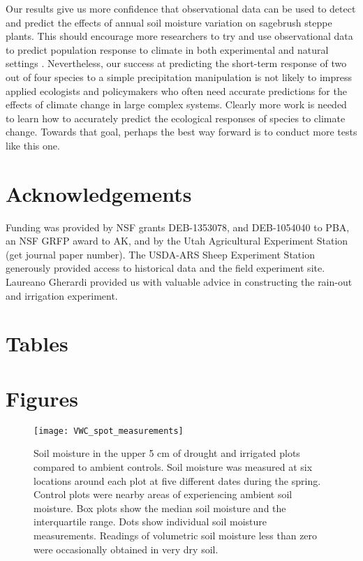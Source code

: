 \documentclass[11pt]{article}
\begin{document}
\begin{doublespace}
Our results give us more confidence that observational data can be used to detect and predict the effects of annual soil moisture variation on sagebrush steppe plants. This should encourage more researchers to try and use observational data to predict population response to climate in both experimental and natural settings \citep{houlahan_priority_2016,ehrlen_advancing_2016}. Nevertheless, our success at predicting the short-term response of two out of four species to a simple precipitation manipulation is not likely to impress applied ecologists and policymakers who often need accurate predictions for the effects of climate change in large complex systems. Clearly more work is needed to learn how to accurately predict the ecological responses of species to climate change. Towards that goal, perhaps the best way forward is to conduct more tests like this one.   
  
\section*{Acknowledgements}

Funding was provided by NSF grants DEB-1353078, and DEB-1054040 to PBA, an NSF GRFP award to AK, and by the Utah Agricultural Experiment Station (get journal paper number). The USDA-ARS Sheep Experiment Station generously provided access to historical data and the field experiment site. Laureano Gherardi provided us with valuable advice in constructing the rain-out and irrigation experiment. 

\newpage




\end{doublespace} 

\clearpage
\newpage

\section*{Tables}










\clearpage
\newpage


\section*{Figures}


\begin{figure}[!htbp]
	\centering
	\texttt{[image: VWC\_spot\_measurements]}
	\caption{Soil moisture in the upper 5 cm of drought and irrigated plots compared to ambient controls. Soil moisture was measured at six locations around each plot at five different dates during the spring. Control plots were nearby areas of experiencing ambient soil moisture. Box plots show the median soil moisture and the interquartile range.  Dots show individual soil moisture measurements. Readings of volumetric soil moisture less than zero were occasionally obtained in very dry soil.}
	\label{fig:spotVWC}
\end{figure}
\end{document}
